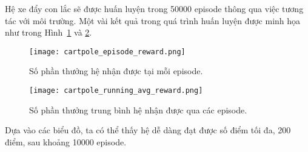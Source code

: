 Hệ xe đẩy con lắc sẽ được huấn luyện trong 50000 episode
thông qua việc tương tác với môi trường.
Một vài kết quả trong quá trình huấn luyện được minh họa như trong
Hình~\ref{fig:cartpole_episode_reward} và \ref{fig:cartpole_running_avg_reward}.

\begin{figure}[H]
    \centering
    \texttt{[image: cartpole\_episode\_reward.png]}
    \caption{Số phần thưởng hệ nhận được tại mỗi episode.}
    \label{fig:cartpole_episode_reward}
\end{figure}

\begin{figure}[H]
    \centering
    \texttt{[image: cartpole\_running\_avg\_reward.png]}
    \caption{Số phần thưởng trung bình hệ nhận được qua các episode.}
    \label{fig:cartpole_running_avg_reward}
\end{figure}

Dựa vào các biểu đồ, ta có thể thấy hệ dễ dàng đạt được
số điểm tối đa, 200 điểm, sau khoảng 10000 episode.